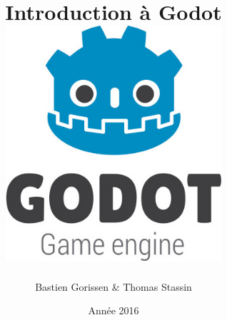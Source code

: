 \documentclass[12pt,a4paper]{report}
\begin{document}
\title{{\huge Introduction à Godot}\\
\vspace{3cm}
\includegraphics[width=8cm]{img/godot_logo.jpg}
}
\author{Bastien Gorissen \& Thomas Stassin}
\date{Année 2016}

\maketitle
\tableofcontents



\end{document}
